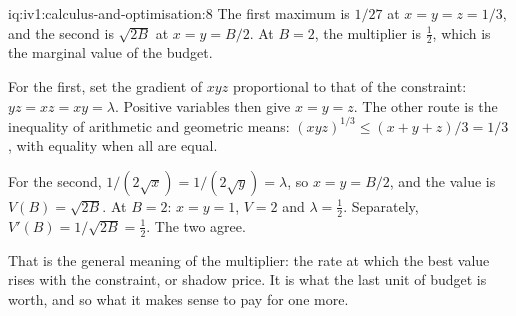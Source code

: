 \begin{solution}{iq:iv1:calculus-and-optimisation:8}
The first maximum is $1/27$ at $x = y = z = 1/3$, and the second is $\sqrt{2B}$ at $x = y = B/2$. At $B = 2$, the multiplier is $\frac12$, which is the marginal value of the budget.

For the first, set the gradient of $xyz$ proportional to that of the constraint: $yz = xz = xy = \lambda$. Positive variables then give $x = y = z$. The other route is the inequality of arithmetic and geometric means: $(xyz)^{1/3} \le (x + y + z)/3 = 1/3$, with equality when all are equal.

For the second, $1/(2\sqrt{x}) = 1/(2\sqrt{y}) = \lambda$, so $x = y = B/2$, and the value is $V(B) = \sqrt{2B}$. At $B = 2$: $x = y = 1$, $V = 2$ and $\lambda = \frac12$. Separately, $V'(B) = 1/\sqrt{2B} = \frac12$. The two agree.

That is the general meaning of the multiplier: the rate at which the best value rises with the constraint, or shadow price. It is what the last unit of budget is worth, and so what it makes sense to pay for one more.



\end{solution}

